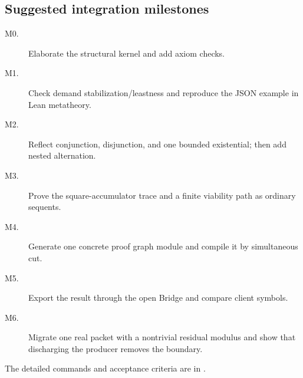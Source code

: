 \subsection{Suggested integration milestones}

\begin{description}
  \item[M0.] Elaborate the structural kernel and add axiom checks.
  \item[M1.] Check demand stabilization/leastness and reproduce the JSON
        example in Lean metatheory.
  \item[M2.] Reflect conjunction, disjunction, and one bounded existential;
        then add nested alternation.
  \item[M3.] Prove the square-accumulator trace and a finite viability path as
        ordinary sequents.
  \item[M4.] Generate one concrete proof graph module and compile it by
        simultaneous cut.
  \item[M5.] Export the result through the open Bridge and compare client
        symbols.
  \item[M6.] Migrate one real packet with a nontrivial residual modulus and
        show that discharging the producer removes the boundary.
\end{description}
The detailed commands and acceptance criteria are in
.

